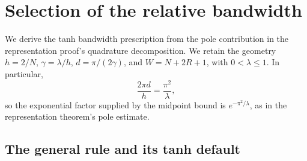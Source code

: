 \documentclass[11pt]{article}
\begin{document}
\providecommand{\qeqref}[1]{(\ref{#1})}


\section{Selection of the relative bandwidth}
\label{sec:qi-bandwidth}

We derive the tanh bandwidth prescription from the pole contribution in
the representation proof's quadrature decomposition. We retain the geometry
$h=2/N$, $\gamma=\lambda/h$, $d=\pi/(2\gamma)$, and
$W=N+2R+1$, with $0<\lambda\le1$. In particular,
\begin{equation}
 \frac{2\pi d}{h}=\frac{\pi^2}{\lambda},
 \label{eq:bandwidth-exponent}
\end{equation}
so the exponential factor supplied by the midpoint bound is
$e^{-\pi^2/\lambda}$, as in the representation theorem's pole estimate.

\providecommand{\BandwidthWidthFigure}{figures/bandwidth_width_rules.pdf}
\providecommand{\BandwidthErrorFigure}{figures/bandwidth_error_rules.pdf}

\subsection{The general rule and its tanh default}
\label{app:bw-general-rule}
\end{document}
